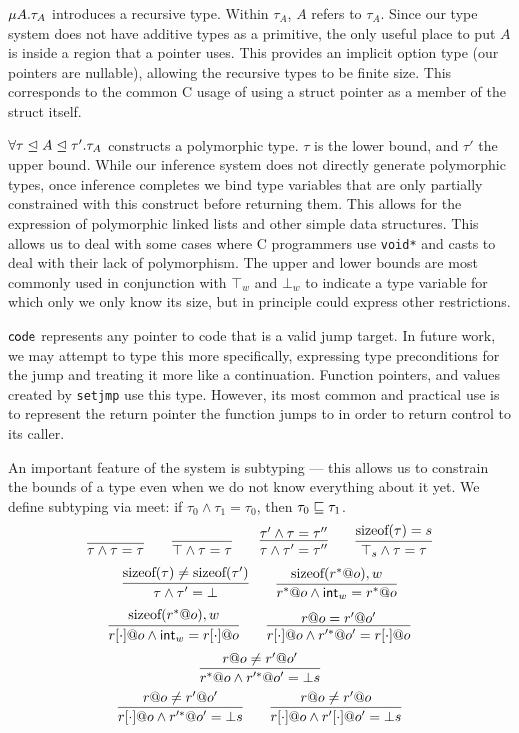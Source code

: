 $\mu A. \tau_A$ introduces a recursive type. Within $\tau_A$, $A$ refers to $\tau_A$. Since our type system does not have additive types as a primitive, the only useful place to put $A$ is inside a region that a pointer uses. This provides an implicit option type (our pointers are nullable), allowing the recursive types to be finite size. This corresponds to the common C usage of using a struct pointer as a member of the struct itself.

$\forall \tau\mathrel{\unlhd} A\mathrel{\unlhd} \tau'.\tau_A$ constructs a polymorphic type. $\tau$ is the lower bound, and $\tau'$ the upper bound. While our inference system does not directly generate polymorphic types, once inference completes we bind type variables that are only partially constrained with this construct before returning them. This allows for the expression of polymorphic linked lists and other simple data structures. This allows us to deal with some cases where C programmers use \texttt{void*} and casts to deal with their lack of polymorphism. The upper and lower bounds are most commonly used in conjunction with $\top_{w}$ and $\bot_{w}$ to indicate a type variable for which only we only know its size, but in principle could express other restrictions.

$\mathsf{code}$ represents any pointer to code that is a valid jump target. In future work, we may attempt to type this more specifically, expressing type preconditions for the jump and treating it more like a continuation. Function pointers, and values created by \texttt{setjmp} use this type. However, its most common and practical use is to represent the return pointer the function jumps to in order to return control to its caller.

An important feature of the system is subtyping --- this allows us to constrain the bounds of a type even when we do not know everything about it yet.
We define subtyping via meet: if $\tau_0 \wedge \tau_1 = \tau_0$, then $\tau_0 \sqsubseteq \tau_1$.
\[
\infer{\tau \wedge \tau = \tau}{}
\qquad
\infer{\utop \wedge \tau = \tau}{}
\qquad
\infer{\tau \wedge \tau' = \tau''}{\tau' \wedge \tau = \tau''}
\qquad
\infer{\top_{s} \wedge \tau = \tau}{\textrm{sizeof}(\tau) = s}
\]
\[
\infer{\tau \wedge \tau' = \ubot}{\textrm{sizeof}(\tau) \neq \textrm{sizeof}(\tau')}
\qquad
\infer{\lptr{r}{o} \wedge \tint{w} = \lptr{r}{o}}{\textrm{sizeof}(\lptr{r}{o}), w}
\]
\[
\infer{\aptr{r}{o} \wedge \tint{w} = \aptr{r}{o}}{\textrm{sizeof}(\lptr{r}{o}), w}
\qquad
\infer{\aptr{r}{o} \wedge \lptr{r'}{o'} = \aptr{r}{o}}{r@o = r'@o'}
\]
\[
\infer{\lptr{r}{o} \wedge \lptr{r'}{o'} = \bot{s}}{r@o \neq r'@o'}
\]
\[
\infer{\aptr{r}{o} \wedge \lptr{r'}{o'} = \bot{s}}{r@o \neq r'@o'}
\qquad
\infer{\aptr{r}{o} \wedge \aptr{r'}{o'} = \bot{s}}{r@o \neq r'@o}
\]

